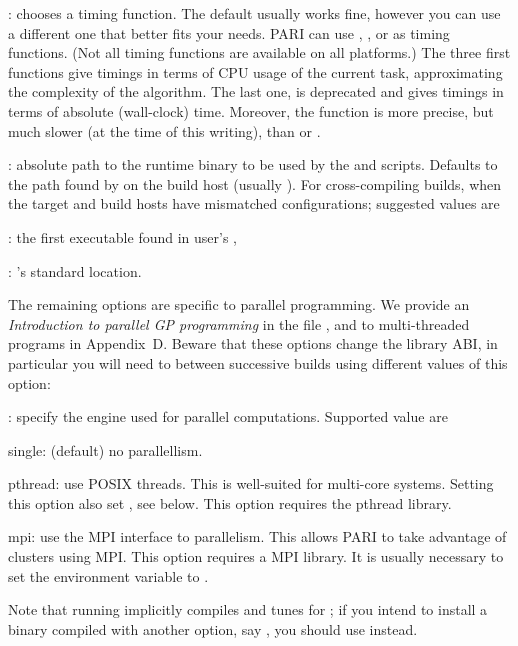 : chooses a timing function. The default usually
works fine, however you can use a different one that better fits your needs.
PARI can use , ,  or
 as timing functions. (Not all timing functions are available on
all platforms.) The three first functions give timings in terms of CPU usage
of the current task, approximating the complexity of the algorithm. The last
one,  is deprecated and gives timings in terms of absolute
(wall-clock) time.
Moreover, the  function is more precise, but much slower
(at the time of this writing), than  or .

: absolute path to the runtime 
binary to be used by the  and  scripts. Defaults
to the path found by  on the build host (usually
). For cross-compiling builds, when the target and build
hosts have mismatched configurations; suggested values are

: the first  executable found in user's
,

: 's standard location.

The remaining options are specific to parallel programming. We provide an
\emph{Introduction to parallel GP programming} in the file
, and to multi-threaded  programs
in Appendix~D. Beware that these options change the library ABI, in
particular you will need to  between successive builds
using different values of this option:

: specify the engine used for parallel computations.
Supported value are

\item single: (default) no parallellism.

\item pthread: use POSIX threads. This is well-suited for multi-core systems.
Setting this option also set , see below. This option
requires the pthread library.

\item mpi: use the MPI interface to parallelism.  This allows PARI to take
advantage of clusters using MPI. This option requires a MPI library.
It is usually necessary to set the environment variable  to
.

Note that running  implicitly compiles and tunes for
; if you intend to install a binary compiled with
another option, say , you should use  instead.

